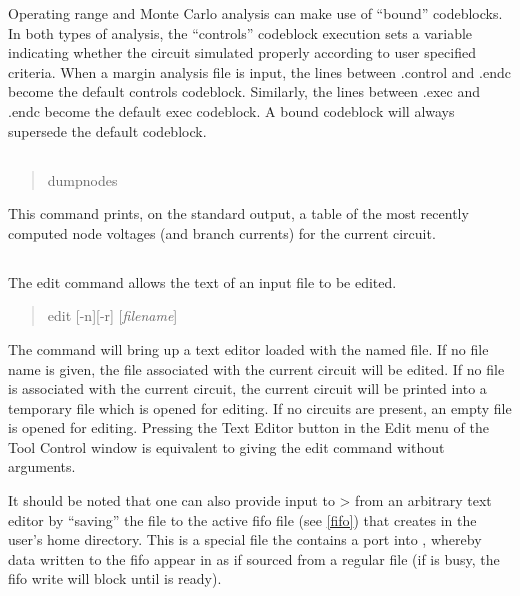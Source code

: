 Operating range and Monte Carlo analysis can make use of ``bound''
codeblocks.  In both types of analysis, the ``controls'' codeblock
execution sets a variable indicating whether the circuit simulated
properly according to user specified criteria.  When a margin analysis
file is input, the lines between {\vt .control} and {\vt .endc} become
the default controls codeblock.  Similarly, the lines between {\vt
.exec} and {\vt .endc} become the default exec codeblock.  A bound
codeblock will always supersede the default codeblock.

\subsection{}


\begin{quote}\vt
dumpnodes
\end{quote}

This command prints, on the standard output, a table of the most
recently computed node voltages (and branch currents) for the current
circuit.

\subsection{}


The {\cb edit} command allows the text of an input file to be edited.
\begin{quote}\vt
edit [-n][-r] [{\it filename\/}]
\end{quote}
The command will bring up a text editor loaded with the named file. 
If no file name is given, the file associated with the current circuit
will be edited.  If no file is associated with the current circuit,
the current circuit will be printed into a temporary file which is
opened for editing.  If no circuits are present, an empty file is
opened for editing.  Pressing the {\cb Text Editor} button in the {\cb
Edit} menu of the {\cb Tool Control} window is equivalent to giving
the {\cb edit} command without arguments.

It should be noted that one can also provide input to {\WRspice}> from
an arbitrary text editor by ``saving'' the file to the active fifo
file (see \ref{fifo}) that {\WRspice} creates in the user's home
directory.  This is a special file the contains a port into
{\WRspice}, whereby data written to the fifo appear in {\WRspice} as
if sourced from a regular file (if {\WRspice} is busy, the fifo write
will block until {\WRspice} is ready).

